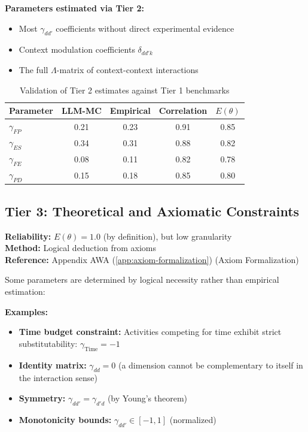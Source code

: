 \documentclass[11pt,a4paper]{article}
\theoremstyle{definition}
\begin{document}
\textbf{Parameters estimated via Tier 2:}
\begin{itemize}
    \item Most $\gamma_{dd'}$ coefficients without direct experimental evidence
    \item Context modulation coefficients $\delta_{dd'k}$
    \item The full $\Lambda$-matrix of context-context interactions
\end{itemize}

\begin{table}[h]
\centering
\small
\begin{tabular}{lcccc}
\toprule
\textbf{Parameter} & \textbf{LLM-MC} & \textbf{Empirical} & \textbf{Correlation} & $E(\theta)$ \\
\midrule
$\gamma_{FP}$ & 0.21 & 0.23 & 0.91 & 0.85 \\
$\gamma_{ES}$ & 0.34 & 0.31 & 0.88 & 0.82 \\
$\gamma_{FE}$ & 0.08 & 0.11 & 0.82 & 0.78 \\
$\gamma_{PD}$ & 0.15 & 0.18 & 0.85 & 0.80 \\
\bottomrule
\end{tabular}
\caption{Validation of Tier 2 estimates against Tier 1 benchmarks}
\label{tab:tier2-validation}
\end{table}

\subsection{Tier 3: Theoretical and Axiomatic Constraints}

\begin{tcolorbox}[colback=gray!5!white, colframe=gray!75!black]
\textbf{Reliability:} $E(\theta) = 1.0$ (by definition), but low granularity \\
\textbf{Method:} Logical deduction from axioms \\
\textbf{Reference:} Appendix AWA (\ref{app:axiom-formalization}) (Axiom Formalization)
\end{tcolorbox}

Some parameters are determined by logical necessity rather than empirical 
estimation:

\textbf{Examples:}
\begin{itemize}
    \item \textbf{Time budget constraint:} Activities competing for time exhibit 
    strict substitutability: $\gamma_{\text{Time}} = -1$
    \item \textbf{Identity matrix:} $\gamma_{dd} = 0$ (a dimension cannot be 
    complementary to itself in the interaction sense)
    \item \textbf{Symmetry:} $\gamma_{dd'} = \gamma_{d'd}$ (by Young's theorem)
    \item \textbf{Monotonicity bounds:} $\gamma_{dd'} \in [-1, 1]$ (normalized)
\end{itemize}
\end{document}
